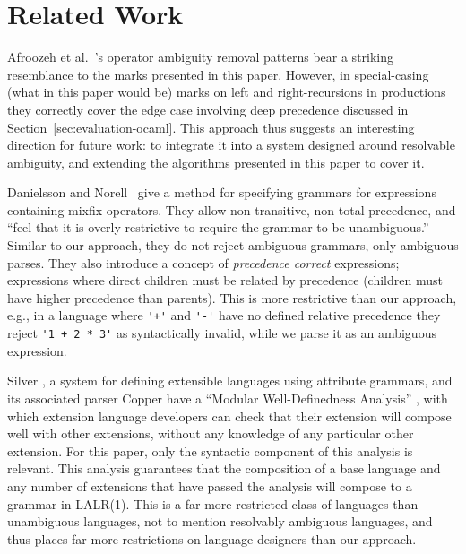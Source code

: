 \documentclass[runningheads]{llncs}
\begin{document}
\section{Related Work}\label{sec:related-work}

Afroozeh et al.~\cite{afroozehSafeSpecificationOperator2013}'s operator ambiguity removal patterns bear a striking resemblance to the marks presented in this paper. However, in special-casing (what in this paper would be) marks on left and right-recursions in productions they correctly cover the edge case involving deep precedence discussed in Section~\ref{sec:evaluation-ocaml}. This approach thus suggests an interesting direction for future work: to integrate it into a system designed around resolvable ambiguity, and extending the algorithms presented in this paper to cover it.

Danielsson and Norell~\cite{danielssonParsingMixfixOperators2011} give a method for specifying grammars for expressions containing mixfix operators. They allow non-transitive, non-total precedence, and ``feel that it is overly restrictive to require the grammar to be unambiguous.'' Similar to our approach, they do not reject ambiguous grammars, only ambiguous parses. They also introduce a concept of \emph{precedence correct} expressions; expressions where direct children must be related by precedence (children must have higher precedence than parents). This is more restrictive than our approach, e.g., in a language where \verb|'+'| and \verb|'-'| have no defined relative precedence they reject \verb|'1 + 2 * 3'| as syntactically invalid, while we parse it as an ambiguous expression.

Silver \cite{vanwykSilverExtensibleAttribute2010}, a system for defining extensible languages using attribute grammars, and its associated parser Copper \cite{vanwykContextawareScanningParsing2007} have a ``Modular Well-Definedness Analysis'' \cite{kaminskiModularWellDefinednessAnalysis2013}, with which extension language developers can check that their extension will compose well with other extensions, without any knowledge of any particular other extension. For this paper, only the syntactic component \cite{schwerdfegerVerifiableCompositionDeterministic2009} of this analysis is relevant. This analysis guarantees that the composition of a base language and any number of extensions that have passed the analysis will compose to a grammar in LALR(1). This is a far more restricted class of languages than unambiguous languages, not to mention resolvably ambiguous languages, and thus places far more restrictions on language designers than our approach.
\end{document}
